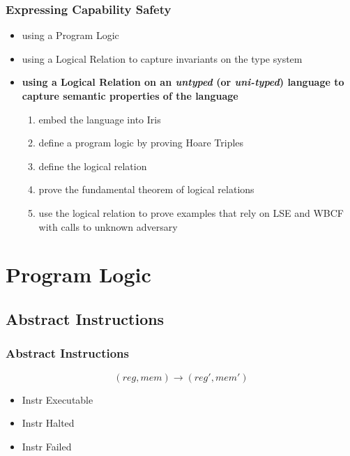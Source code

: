 \documentclass{beamer}
\begin{document}

\begin{frame}
\frametitle{Expressing Capability Safety}

\begin{itemize}
	\item<2-> using a Program Logic 
	\item<3-> using a Logical Relation to capture invariants on the type system
	\item<4-> \textbf{using a Logical Relation on an \emph{untyped} (or \emph{uni-typed}) language to capture semantic properties of the language}
	\begin{enumerate}
		\item<5-> embed the language into Iris
		\item<6-> define a program logic by proving Hoare Triples
		\item<7-> define the logical relation
		\item<8-> prove the fundamental theorem of logical relations
		\item<9-> use the logical relation to prove examples that rely on LSE and WBCF with calls to unknown adversary
	\end{enumerate}
\end{itemize}

\end{frame}

\section{Program Logic}
\subsection{Abstract Instructions}

\begin{frame}
\frametitle{Abstract Instructions}

$$(reg,mem) \rightarrow (reg',mem')$$
%
\begin{itemize}
	\item<2-> \textsf{Instr Executable}
	\item<3-> \textsf{Instr Halted} \uncover<5->{$\rightarrow$ \textsf{HaltedV}}
	\item<4-> \textsf{Instr Failed} \uncover<5->{$\rightarrow$ \textsf{FailedV}}
\end{itemize}

\end{frame}
\end{document}
